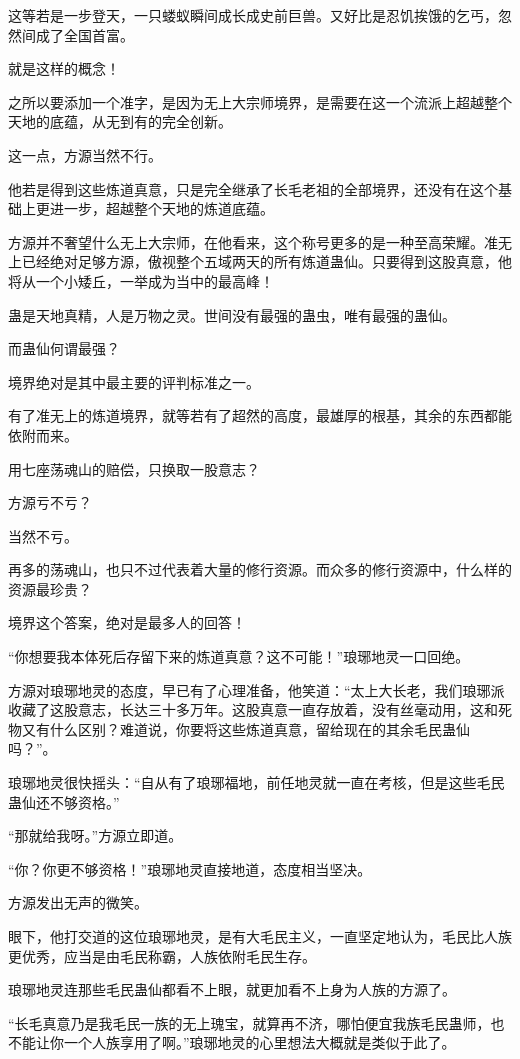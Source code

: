 \begin{this_body}
这等若是一步登天，一只蝼蚁瞬间成长成史前巨兽。又好比是忍饥挨饿的乞丐，忽然间成了全国首富。

就是这样的概念！

之所以要添加一个准字，是因为无上大宗师境界，是需要在这一个流派上超越整个天地的底蕴，从无到有的完全创新。

这一点，方源当然不行。

他若是得到这些炼道真意，只是完全继承了长毛老祖的全部境界，还没有在这个基础上更进一步，超越整个天地的炼道底蕴。

方源并不奢望什么无上大宗师，在他看来，这个称号更多的是一种至高荣耀。准无上已经绝对足够方源，傲视整个五域两天的所有炼道蛊仙。只要得到这股真意，他将从一个小矮丘，一举成为当中的最高峰！

蛊是天地真精，人是万物之灵。世间没有最强的蛊虫，唯有最强的蛊仙。

而蛊仙何谓最强？

境界绝对是其中最主要的评判标准之一。

有了准无上的炼道境界，就等若有了超然的高度，最雄厚的根基，其余的东西都能依附而来。

用七座荡魂山的赔偿，只换取一股意志？

方源亏不亏？

当然不亏。

再多的荡魂山，也只不过代表着大量的修行资源。而众多的修行资源中，什么样的资源最珍贵？

境界这个答案，绝对是最多人的回答！

“你想要我本体死后存留下来的炼道真意？这不可能！”琅琊地灵一口回绝。

方源对琅琊地灵的态度，早已有了心理准备，他笑道：“太上大长老，我们琅琊派收藏了这股意志，长达三十多万年。这股真意一直存放着，没有丝毫动用，这和死物又有什么区别？难道说，你要将这些炼道真意，留给现在的其余毛民蛊仙吗？”。

琅琊地灵很快摇头：“自从有了琅琊福地，前任地灵就一直在考核，但是这些毛民蛊仙还不够资格。”

“那就给我呀。”方源立即道。

“你？你更不够资格！”琅琊地灵直接地道，态度相当坚决。

方源发出无声的微笑。

眼下，他打交道的这位琅琊地灵，是有大毛民主义，一直坚定地认为，毛民比人族更优秀，应当是由毛民称霸，人族依附毛民生存。

琅琊地灵连那些毛民蛊仙都看不上眼，就更加看不上身为人族的方源了。

“长毛真意乃是我毛民一族的无上瑰宝，就算再不济，哪怕便宜我族毛民蛊师，也不能让你一个人族享用了啊。”琅琊地灵的心里想法大概就是类似于此了。


\end{this_body}
